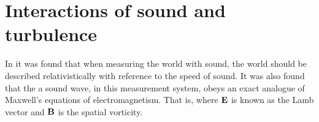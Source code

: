 

\section{Interactions of sound and turbulence}

In  it was found that when measuring the world with sound,
the world should be described relativistically with reference to the speed of sound.
It was also found that the a sound wave, in this measurement system, obeys an exact analogue of
Maxwell's equations of electromagnetism.
That is, 
where  $\mathbf{E}$ is known as the Lamb vector and $\mathbf{B}$ is the spatial vorticity.


